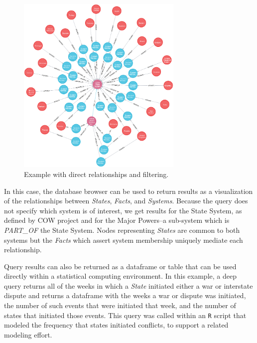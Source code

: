 \documentclass[runningheads]{llncs}
\begin{document}
\begin{figure}
\centering
\includegraphics[width=300]{simpleMembershipGraph.png}
\caption{Example with direct relationships and filtering.} \label{simple}
\end{figure}

In this case, the database browser can be used to return results as a visualization of the relationships between \textit{States}, \textit{Facts}, and \textit{Systems}.
Because the query does not specify which system is of interest, we get results for the State System, as defined by COW project and for the Major Powers--a sub-system which is \textit{PART\_OF} the State System. 
Nodes representing \textit{States} are common to both systems but the \textit{Facts} which assert system membership uniquely mediate each relationship.

Query results can also be returned as a dataframe or table that can be used directly within a statistical computing environment.
In this example, a deep query returns all of the weeks in which a \textit{State} initiated either a war or interstate dispute and returns a dataframe with the weeks a war or dispute was initiated, the number of such events that were initiated that week, and the number of states that initiated those events.
This query was called within an \texttt{R} script that modeled the frequency that states initiated conflicts, to support a related modeling effort.
\end{document}
